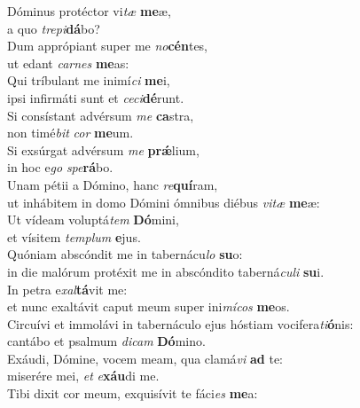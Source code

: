 \evenverse Dóminus protéctor vi\textit{tæ} \textbf{me}æ,~\*\\
\evenverse a quo \textit{tre}\textit{pi}\textbf{dá}bo?\\
\oddverse Dum apprópiant super me \textit{no}\textbf{cén}tes,~\*\\
\oddverse ut edant \textit{car}\textit{nes} \textbf{me}as:\\
\evenverse Qui tríbulant me inimí\textit{ci} \textbf{me}i,~\*\\
\evenverse ipsi infirmáti sunt et \textit{ce}\textit{ci}\textbf{dé}runt.\\
\oddverse Si consístant advérsum \textit{me} \textbf{ca}stra,~\*\\
\oddverse non timé\textit{bit} \textit{cor} \textbf{me}um.\\
\evenverse Si exsúrgat advérsum \textit{me} \textbf{prǽ}lium,~\*\\
\evenverse in hoc e\textit{go} \textit{spe}\textbf{rá}bo.\\
\oddverse Unam pétii a Dómino, hanc \textit{re}\textbf{quí}ram,~\*\\
\oddverse ut inhábitem in domo Dómini ómnibus diébus \textit{vi}\textit{tæ} \textbf{me}æ:\\
\evenverse Ut vídeam voluptá\textit{tem} \textbf{Dó}mini,~\*\\
\evenverse et vísitem \textit{tem}\textit{plum} \textbf{e}jus.\\
\oddverse Quóniam abscóndit me in tabernácu\textit{lo} \textbf{su}o:~\*\\
\oddverse in die malórum protéxit me in abscóndito taberná\textit{cu}\textit{li} \textbf{su}i.\\
\evenverse In petra e\textit{xal}\textbf{tá}vit me:~\*\\
\evenverse et nunc exaltávit caput meum super ini\textit{mí}\textit{cos} \textbf{me}os.\\
\oddverse Circuívi et immolávi in tabernáculo ejus hóstiam vocifera\textit{ti}\textbf{ó}nis:~\*\\
\oddverse cantábo et psalmum \textit{di}\textit{cam} \textbf{Dó}mino.\\
\evenverse Exáudi, Dómine, vocem meam, qua clamá\textit{vi} \textbf{ad} te:~\*\\
\evenverse miserére mei, \textit{et} \textit{e}\textbf{xáu}di me.\\
\oddverse Tibi dixit cor meum, exquisívit te fáci\textit{es} \textbf{me}a:~\*\\
